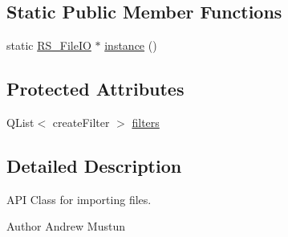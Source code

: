\subsection*{Static Public Member Functions}
\begin{DoxyCompactItemize}
\item 
static \hyperlink{classRS__FileIO}{R\-S\-\_\-\-File\-I\-O} $\ast$ \hyperlink{classRS__FileIO_a6a9bac656c5dbb8107760bb7a0fe3430}{instance} ()
\end{DoxyCompactItemize}
\subsection*{Protected Attributes}
\begin{DoxyCompactItemize}
\item 
Q\-List$<$ create\-Filter $>$ \hyperlink{classRS__FileIO_ad32f7db696de4ab4bf85b01528e96235}{filters}
\end{DoxyCompactItemize}


\subsection{Detailed Description}
A\-P\-I Class for importing files.

\begin{DoxyAuthor}{Author}
Andrew Mustun 
\end{DoxyAuthor}


